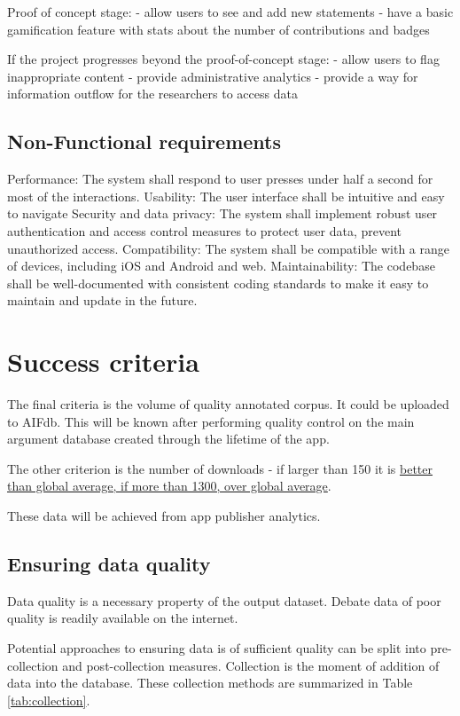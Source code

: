 \documentclass{article}
\begin{document}
Proof of concept stage:
- allow users to see and add new statements
- have a basic gamification feature with stats about the number of contributions and badges

If the project progresses beyond the proof-of-concept stage:
- allow users to flag inappropriate content
- provide administrative analytics 
- provide a way for information outflow for the researchers to access data

\subsection{Non-Functional requirements}
Performance: The system shall respond to user presses under half a second for most of the interactions.
Usability: The user interface shall be intuitive and easy to navigate
Security and data privacy: The system shall implement robust user authentication and access control measures to protect user data, prevent unauthorized access.
Compatibility: The system shall be compatible with a range of devices, including iOS and Android and web.
Maintainability: The codebase shall be well-documented with consistent coding standards to make it easy to maintain and update in the future.


\section{Success criteria}
The final criteria is the volume of quality annotated corpus. It could be uploaded to AIFdb. 
This will be known after performing quality control on the main argument database created through the lifetime of the app. 

The other criterion is the number of downloads - if larger than 150 it is \href{https://www.statista.com/statistics/1119893/average-number-downloads-united-states-app-publishers/}{ better than global average, if more than 1300, over global average}.


These data will be achieved from app publisher analytics.

\subsection{Ensuring data quality}
Data quality is a necessary property of the output dataset. Debate data of poor quality is readily available on the internet.

Potential approaches to ensuring data is of sufficient quality can be split into pre-collection and post-collection measures. Collection is the moment of addition of data into the database. These collection methods are summarized in Table \ref{tab:collection}.
\end{document}
